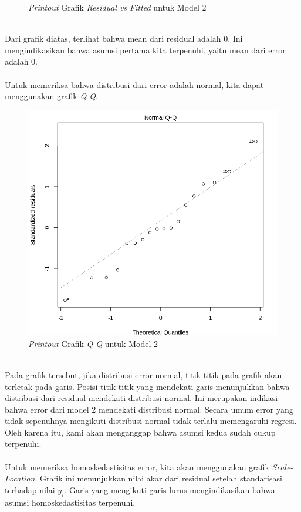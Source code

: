 \begin{enumerate}
\begin{figure}[h!]
    \caption{\textit{Printout} Grafik \textit{Residual vs Fitted} untuk Model 2}
    \label{fig:res vs fitted}
\end{figure}~\\
Dari grafik diatas, terlihat bahwa mean dari residual adalah 0. Ini mengindikasikan bahwa asumsi pertama kita terpenuhi, yaitu mean dari error adalah 0.
\\~\\
Untuk memeriksa bahwa distribusi dari error adalah normal, kita dapat menggunakan grafik \textit{Q-Q}.\\
\begin{figure}[h!]
    \centering
    \includegraphics[scale=0.5]{src/Pics/normality.png}
    \caption{\textit{Printout} Grafik \textit{Q-Q} untuk Model 2}
\end{figure}~\\
Pada grafik tersebut, jika distribusi error normal, titik-titik pada grafik akan terletak pada garis. Posisi titik-titik yang mendekati garis menunjukkan bahwa distribusi dari residual mendekati distribusi normal. Ini merupakan indikasi bahwa error dari model 2 mendekati distribusi normal. Secara umum error yang tidak sepenuhnya mengikuti distribusi normal tidak terlalu memengaruhi regresi. Oleh karena itu, kami akan menganggap bahwa asumsi kedua sudah cukup terpenuhi.
\\~\\
Untuk memeriksa homoskedastisitas error, kita akan menggunakan grafik \textit{Scale-Location}. Grafik ini menunjukkan nilai akar dari residual setelah standarisasi terhadap nilai $y_i$. Garis yang mengikuti garis lurus mengindikasikan bahwa asumsi homoskedastisitas terpenuhi.\\

\end{enumerate}
